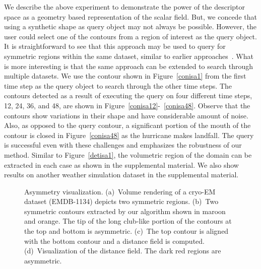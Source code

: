 \documentclass[review,journal]{vgtc}         %
\begin{document}
We describe the above experiment to demonstrate the power of the descriptor space as a geometry based representation 
of the scalar field. But, we concede that using a synthetic shape as query object may not always be 
possible. However, the user could select one of the contours from a region of interest as the query
object. It is straightforward to see that this approach may be used
to query for symmetric regions within the same dataset, similar to earlier approaches~\cite{ThomN13,MasoodTN13}.
What is more interesting is that the same approach can be extended to search through multiple datasets.
We use the contour shown in Figure~\ref{conisa1} from the first time step as the query object to search through 
the other time steps. The contours detected as a result of executing the query on four different time 
steps, 12, 24, 36, and 48, are shown in Figure~\ref{conisa12}-~\ref{conisa48}. Observe that
the contours show variations in their shape and have considerable amount of noise. 
Also, as opposed to the query contour, a significant portion
of the mouth of the contour is closed in Figure~\ref{conisa48} as the hurricane makes landfall.
The query is successful even with these challenges and emphasizes the robustness of our method.
Similar to Figure~\ref{detisa1}, the volumetric region of the domain can be extracted in 
each case as shown in the supplemental material. We also show results on another weather
simulation dataset in the supplemental material.
\begin{figure*}[t]
	\centering
	\caption{\label{asym}Asymmetry visualization. (a)~Volume rendering of a cryo-EM dataset (EMDB-1134) 
	depicts two symmetric regions. (b)~Two symmetric contours extracted by our algorithm shown
in maroon and orange. The tip of the long club-like portion of the contours at the top and bottom is asymmetric.
(c)~The top contour is aligned with the bottom contour and a distance field is computed. (d)~Visualization
of the distance field. The dark red regions are asymmetric.}
\end{figure*}
\end{document}

